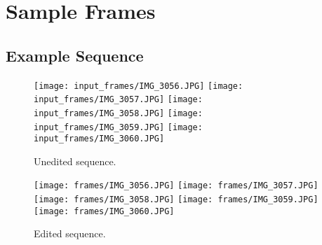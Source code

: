 \documentclass[12pt]{article}
\begin{document}
        
    \section{Sample Frames}
        \subsection{Example Sequence}
            \begin{figure}[H]
                \centering
                \texttt{[image: input\_frames/IMG\_3056.JPG]}
                \texttt{[image: input\_frames/IMG\_3057.JPG]}
                \texttt{[image: input\_frames/IMG\_3058.JPG]}
                \texttt{[image: input\_frames/IMG\_3059.JPG]}
                \texttt{[image: input\_frames/IMG\_3060.JPG]}
                \caption{Unedited sequence.}
            \end{figure}
            \begin{figure}[H]
                \centering
                \texttt{[image: frames/IMG\_3056.JPG]}
                \texttt{[image: frames/IMG\_3057.JPG]}
                \texttt{[image: frames/IMG\_3058.JPG]}
                \texttt{[image: frames/IMG\_3059.JPG]}
                \texttt{[image: frames/IMG\_3060.JPG]}
                \caption{Edited sequence.}
            \end{figure}
\end{document}
